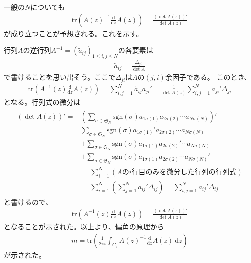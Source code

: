\documentclass{jsarticle}
\def\diff{\textrm{d}}
\begin{document}
一般の$N$についても
\begin{align}
\mathrm{tr}\left(A(z)^{-1}\frac{\diff}{\diff z}A(z)\right)=\frac{\left(\det A(z)\right)'}{\det A(z)}
\end{align}
が成り立つことが予想される。これを示す。

行列$A$の逆行列$A^{-1}=(\tilde{a}_{ij})_{1\leq i,j\leq N}$の各要素は
\begin{align}
\tilde{a}_{ij}=\frac{\Delta_{ji}}{\det A}
\end{align}
で書けることを思い出そう。ここで$\Delta_{ji}$は$A$の$(j,i)$余因子である。
このとき、
\begin{align}
\mathrm{tr}\left(A^{-1}(z)\frac{\diff}{\diff z}A(z)\right)
=\sum_{i,j=1}^{N}\tilde{a}_{ij}a_{ji}'
=\frac{1}{\det A(z)}\sum_{i,j=1}^{N}a_{ji}'\Delta_{ji}
\end{align}
となる。行列式の微分は
\begin{align*}
\begin{aligned}
    \left(\det A(z)\right)'=&\left(\sum_{\sigma\in\mathfrak{S}_{N}}\mathrm{sgn}(\sigma)a_{1\sigma(1)}a_{2\sigma(2)}\cdots a_{N\sigma(N)}\right)'\\
    =&\sum_{\sigma\in\mathfrak{S}_{N}}\mathrm{sgn}(\sigma)a_{1\sigma(1)}'a_{2\sigma(2)}\cdots a_{N\sigma(N)}\\
    &+\sum_{\sigma\in\mathfrak{S}_{N}}\mathrm{sgn}(\sigma)a_{1\sigma(1)}a_{2\sigma(2)}'\cdots a_{N\sigma(N)}\\
    &+\sum_{\sigma\in\mathfrak{S}_{N}}\mathrm{sgn}(\sigma)a_{1\sigma(1)}a_{2\sigma(2)}\cdots a_{N\sigma(N)}'\\
    &=\sum_{i=1}^{N}(A\mathrm{の}i\mathrm{行目のみを微分した行列の行列式})\\
    &=\sum_{i=1}^{N}\left(\sum_{j=1}^{N}a_{ij}'\Delta_{ij}\right)
    =\sum_{i,j=1}^{N}a_{ij}'\Delta_{ij}
\end{aligned}
\end{align*}
と書けるので、
\begin{align}
\mathrm{tr}\left(A^{-1}(z)\frac{\diff}{\diff z}A(z)\right)=\frac{\left(\det A(z)\right)'}{\det A(z)}
\end{align}
となることが示された。以上より、偏角の原理から
\begin{align}
    m=\mathrm{tr}\left(\frac{1}{2\pi i}\int_{C_{\varepsilon}}A(z)^{-1}\frac{\diff}{\diff z}A(z)~\diff z\right)
\end{align}
が示された。
\end{document}
